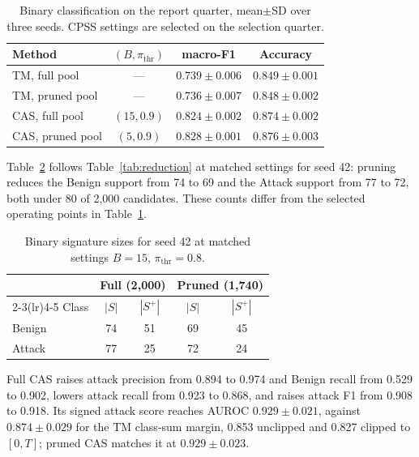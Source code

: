 \documentclass[conference]{IEEEtran}
\begin{document}
\begin{table}[!htb]
\color{blue}
\centering
\caption{Binary classification on the report quarter, mean$\pm$SD
over three seeds. CPSS settings are selected on the selection quarter.}
\label{tab:binary}
\footnotesize
\setlength{\tabcolsep}{3pt}
\begin{tabular}{@{}lccc@{}}
\toprule
Method & $(B,\pi_{\mathrm{thr}})$ & macro-F1 & Accuracy \\
\midrule
TM, full pool & --- & $0.739\pm0.006$ & $0.849\pm0.001$ \\
TM, pruned pool & --- & $0.736\pm0.007$ & $0.848\pm0.002$ \\
CAS, full pool & $(15,0.9)$ & $0.824\pm0.002$ & $0.874\pm0.002$ \\
CAS, pruned pool & $(5,0.9)$ & $\mathbf{0.828\pm0.001}$ & $\mathbf{0.876\pm0.003}$ \\
\bottomrule
\end{tabular}
\end{table}

Table~\ref{tab:binary-reduction} follows Table~\ref{tab:reduction}
at matched settings for seed 42: pruning reduces the Benign support
from 74 to 69 and the Attack support from 77 to 72, both under 80 of
2{,}000 candidates. These counts differ from the selected operating
points in Table~\ref{tab:binary}.

\begin{table}[!htb]
\color{blue}
\centering
\caption{Binary signature sizes for seed 42 at matched settings
$B=15$, $\pi_{\mathrm{thr}}=0.8$.}
\label{tab:binary-reduction}
\footnotesize
\begin{tabular}{@{}lcccc@{}}
\toprule
& \multicolumn{2}{c}{Full (2{,}000)} & \multicolumn{2}{c}{Pruned (1{,}740)} \\
\cmidrule(lr){2-3}\cmidrule(lr){4-5}
Class & $|S|$ & $|S^+|$ & $|S|$ & $|S^+|$ \\
\midrule
Benign & 74 & 51 & 69 & 45 \\
Attack & 77 & 25 & 72 & 24 \\
\bottomrule
\end{tabular}
\end{table}

Full CAS raises attack precision from 0.894 to 0.974 and Benign recall
from 0.529 to 0.902, lowers attack recall from 0.923 to 0.868, and
raises attack F1 from 0.908 to 0.918. Its signed attack score reaches
AUROC $0.929\pm0.021$, against $0.874\pm0.029$ for the TM class-sum
margin, 0.853 unclipped and 0.827 clipped to $[0,T]$; pruned CAS
matches it at $0.929\pm0.023$.
\end{document}
